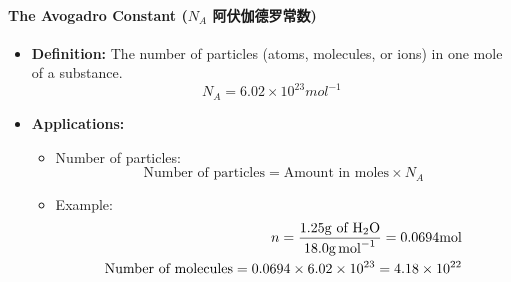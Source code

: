 \paragraph{The Avogadro Constant ($N_A$ 阿伏伽德罗常数)}
\begin{itemize}
    \item \textbf{Definition:} The number of particles (atoms, molecules, or ions) in one mole of a substance.
    \begin{equation}
        N_A = 6.02 \times 10^{23} \unit{mol^{-1}}
    \end{equation}
    \item \textbf{Applications:}
    \begin{itemize}
        \item Number of particles:
        \begin{equation}
            \text{Number of particles} = \text{Amount in moles} \times N_A
        \end{equation}
        \item Example:
        \begin{equation}
            \begin{split}
                n = \frac{1.25 \unit{g} \text{ of } \ce{H2O}}{18.0 \unit{g.mol^{-1}}} = 0.0694 \unit{mol}\\
                \text{Number of molecules} = 0.0694 \times 6.02 \times 10^{23} = 4.18 \times 10^{22}
            \end{split}
        \end{equation}
    \end{itemize}
\end{itemize}

